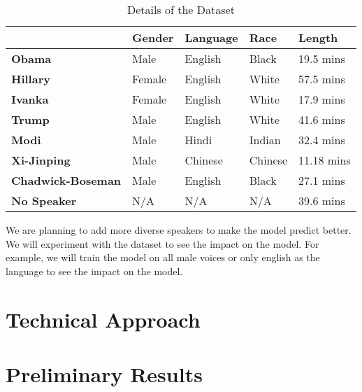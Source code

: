 \documentclass[10pt,twocolumn,letterpaper]{article}
\begin{document}
\begin{table}[h]
    \begin{tabular}{l|l|l|l|l|}
    \cline{2-5}
                                                    & \textbf{Gender} & \textbf{Language} & \textbf{Race} & \textbf{Length} \\ \hline
    \multicolumn{1}{|l|}{\textbf{Obama}}            & Male            & English           & Black         & 19.5 mins       \\ \hline
    \multicolumn{1}{|l|}{\textbf{Hillary}}          & Female          & English           & White         & 57.5 mins       \\ \hline
    \multicolumn{1}{|l|}{\textbf{Ivanka}}           & Female          & English           & White         & 17.9 mins       \\ \hline
    \multicolumn{1}{|l|}{\textbf{Trump}}            & Male            & English           & White         & 41.6 mins       \\ \hline
    \multicolumn{1}{|l|}{\textbf{Modi}}             & Male            & Hindi             & Indian        & 32.4 mins       \\ \hline
    \multicolumn{1}{|l|}{\textbf{Xi-Jinping}}       & Male            & Chinese           & Chinese       & 11.18 mins      \\ \hline
    \multicolumn{1}{|l|}{\textbf{Chadwick-Boseman}} & Male            & English           & Black         & 27.1 mins       \\ \hline
    \multicolumn{1}{|l|}{\textbf{No Speaker}}       & N/A             & N/A               & N/A           & 39.6 mins       \\ \hline
    \end{tabular}
    \caption{Details of the Dataset}
    \label{Dataset}
\end{table}

We are planning to add more diverse speakers to make the model predict better. We will experiment with the dataset to see the impact on the model. For example, we will train the model on all male voices or only english as the language to see the impact on the model. 





\section{Technical Approach}





\section{Preliminary Results}





{\small


}
\end{document}
